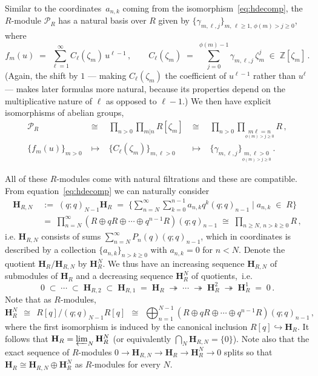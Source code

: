 \documentclass[12pt,reqno]{amsart}
\theoremstyle{definition}
\def\BZ{\mathbb Z}
\def\calP{\mathcal P}
\def\HH{\mathbf H}
\def\be{\begin{equation}}
\def\ee{\end{equation}}
\def\z{\zeta}
\def\={\;=\;}
\def\inn{\;\in\;}
\begin{document}
Similar to the coordinates~$a_{n,k}$ coming from the isomorphism~\eqref{eq:hdecomp},
the $R$-module $\calP_R$ has a natural basis over $R$ given by
$\{\gamma_{m,\ell,j}\}_{m,\,\ell\geq1,\,\phi(m)>j\geq0}$, where
\be
\label{eq:oht.c}
f_{m}(u) \= \sum_{\ell=1}^{\infty} C_{\ell}(\z_m)\,u^{\ell-1}\,,
\qquad C_{\ell}(\z_m)\=
  \sum_{j=0}^{\phi(m)-1}\gamma_{m,\ell,j}\,\z_m^{j}\inn \BZ[\z_m]\,.
\ee
(Again, the shift by $1$ --- making $C_{\ell}(\z_m)$ the coefficient of $u^{\ell-1}$
rather than $u^{\ell}$ --- makes later formulas more natural, because its properties
depend on the multiplicative nature of $\ell$ as opposed to $\ell-1$.)
We then have explicit isomorphisms of abelian groups,
\be
\label{eq:gamma}
\begin{array}{ccccc}
\calP_{R}
&\;\cong\;&
\prod_{n>0}\prod_{m|n}
R[\z_m]
&\;\cong\;&
\prod_{n>0}
\prod_{\underset{\phi(m)>j\geq0}{m\ell=n}}
R\,,\\
\{f_{m}(u)\}_{m>0}
&\;\mapsto\;&
\{C_{\ell}(\z_m)\}_{m,\ell>0}
&\;\mapsto\;&
\{\gamma_{m,\ell,j}\}_{\underset{\phi(m)>j\geq0}{m,\ell>0}}\,.
\end{array}
\ee

All of these $R$-modules come with natural
filtrations
and these are compatible.
From equation~\eqref{eq:hdecomp} we can naturally consider
\be
\begin{aligned}
\HH_{R,N}
&\;:=\; (q;q)_{N-1}\HH_R
\=
\bigg\{\sum_{n=N}^\infty\sum_{k=0}^{n-1}a_{n,k}q^k (q;q)_{n-1}\;
\Big|\;a_{n,k}\inn R\bigg\}\\
&\=\prod_{n=N}^{\infty}
(R\oplus qR\oplus\cdots\oplus q^{n-1}R)(q;q)_{n-1}
\;\cong\;\prod_{n\geq N,\,n>k\geq0}R\,,
\end{aligned}
\ee
i.e. $\HH_{R,N}$ consists of sums $\sum_{n=N}^{\infty}P_{n}(q)(q;q)_{n-1}$, which in
coordinates is described by a collection $\{a_{n,k}\}_{n>k\geq0}$ with $a_{n,k}=0$
for $n<N$. Denote the quotient $\HH_R/\HH_{R,N}$ by $\HH_R^{N}$.
We thus have an increasing sequence $\HH_{R,N}$ of submodules of $\HH_R$ and a
decreasing sequence $\HH_R^N$ of quotients,~i.e.
\be
\label{eq:seq.app}
0\;\subset\;\cdots\;\subset\;\HH_{R,2}\;\subset\;\HH_{R,1}\=\HH_R\;
\twoheadrightarrow\;\cdots
\;\twoheadrightarrow\;\HH_R^{2}
\;\twoheadrightarrow\;\HH_R^{1}
\=0\,.
\ee
Note that as $R$-modules,
\be\label{eq:filt.quot.HH}
\HH_R^{N}
\,\;\cong\;\,
R[q]/(q;q)_{N-1}R[q]
\,\;\cong\;\,
\bigoplus_{n=1}^{N-1}
(R\oplus qR\oplus\cdots\oplus q^{n-1}R)(q;q)_{n-1}\,,
\ee
where the first isomorphism is induced by the canonical inclusion
$R[q]\hookrightarrow\HH_R$.
It follows that $\HH_R = \varprojlim_{N} \HH_R^{N}$ (or equivalently
$\bigcap_N\HH_{R,N}=\{0\}$). Note also that the exact sequence of $R$-modules
$0\to\HH_{R,N}\to\HH_R\to\HH_R^{N}\to0$ splits so that
$\HH_R\cong\HH_{R,N}\oplus \HH_R^{N}$ as $R$-modules for every $N$.
\end{document}
